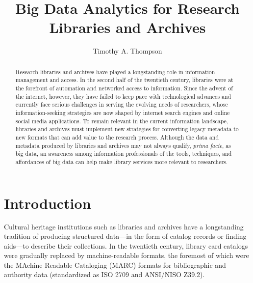 \documentclass[sigconf]{acmart}
\begin{document}
\title{Big Data Analytics for Research Libraries and Archives}


\author{Timothy A. Thompson}

\begin{abstract}

Research libraries and archives have played a longstanding role in information management and access. In the second half of the twentieth century, libraries were at the forefront of automation and networked access to information. Since the advent of the internet, however, they have failed to keep pace with technological advances and currently face serious challenges in serving the evolving needs of researchers, whose information-seeking strategies are now shaped by internet search engines and online social media applications. To remain relevant in the current information landscape, libraries and archives must implement new strategies for converting legacy metadata to new formats that can add value to the research process. Although the data and metadata produced by libraries and archives may not always qualify, \textit{prima facie}, as big data, an awareness among information professionals of the tools, techniques, and affordances of big data can help make library services more relevant to researchers.
\end{abstract}


\maketitle

\section{Introduction}
Cultural heritage institutions such as libraries and archives have a longstanding tradition of producing structured data---in the form of catalog records or finding aids---to describe their collections. In the twentieth century, library card catalogs were gradually replaced by machine-readable formats, the foremost of which were the MAchine Readable Cataloging (MARC) formats for bibliographic and authority data (standardized as ISO 2709 and ANSI/NISO Z39.2)\cite{kF12}. 
\end{document}
